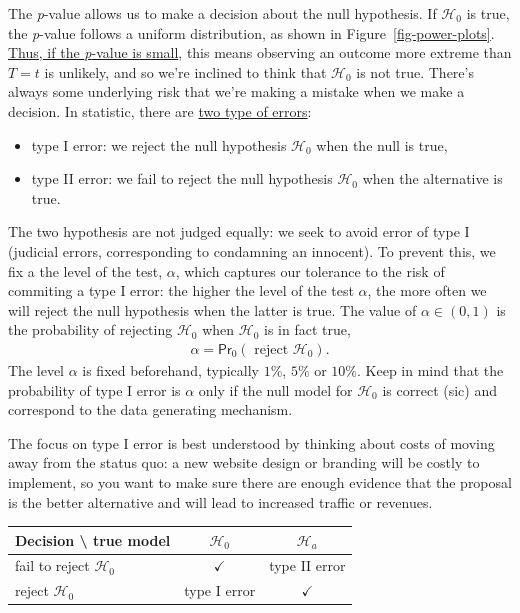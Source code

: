 \documentclass[
  11pt,
  letterpaper,
]{scrbook}
\providecommand{\tightlist}{%
  \setlength{\itemsep}{0pt}\setlength{\parskip}{0pt}}\usepackage{longtable,booktabs,array}
\theoremstyle{definition}
\theoremstyle{remark}
\begin{document}
The \emph{p}-value allows us to make a decision about the null
hypothesis. If \(\mathscr{H}_0\) is true, the \emph{p}-value follows a
uniform distribution, as shown in Figure~\ref{fig-power-plots}.
\href{https://xkcd.com/1478/}{Thus, if the \emph{p}-value is small},
this means observing an outcome more extreme than \(T=t\) is unlikely,
and so we're inclined to think that \(\mathscr{H}_0\) is not true.
There's always some underlying risk that we're making a mistake when we
make a decision. In statistic, there are
\href{https://xkcd.com/2303/}{two type of errors}:

\begin{itemize}
\tightlist
\item
  type I error: we reject the null hypothesis \(\mathscr{H}_0\) when the
  null is true,
\item
  type II error: we fail to reject the null hypothesis \(\mathscr{H}_0\)
  when the alternative is true.
\end{itemize}

The two hypothesis are not judged equally: we seek to avoid error of
type I (judicial errors, corresponding to condamning an innocent). To
prevent this, we fix a the level of the test, \(\alpha\), which captures
our tolerance to the risk of commiting a type I error: the higher the
level of the test \(\alpha\), the more often we will reject the null
hypothesis when the latter is true. The value of \(\alpha \in (0, 1)\)
is the probability of rejecting \(\mathscr{H}_0\) when \(\mathscr{H}_0\)
is in fact true, \begin{align*}
\alpha = \mathsf{Pr}_0\left(\text{ reject } \mathscr{H}_0\right).
\end{align*} The level \(\alpha\) is fixed beforehand, typically
\(1\)\%, \(5\)\% or \(10\)\%. Keep in mind that the probability of type
I error is \(\alpha\) only if the null model for \(\mathscr{H}_0\) is
correct (sic) and correspond to the data generating mechanism.

The focus on type I error is best understood by thinking about costs of
moving away from the status quo: a new website design or branding will
be costly to implement, so you want to make sure there are enough
evidence that the proposal is the better alternative and will lead to
increased traffic or revenues.

\begin{longtable}[]{@{}lcc@{}}
\toprule\noalign{}
\textbf{Decision} \textbackslash{} \textbf{true model} &
\(\mathscr{H}_0\) & \(\mathscr{H}_a\) \\
\midrule\noalign{}
\endhead
\bottomrule\noalign{}
\endlastfoot
fail to reject \(\mathscr{H}_0\) & \(\checkmark\) & type II error \\
reject \(\mathscr{H}_0\) & type I error & \(\checkmark\) \\
\end{longtable}
\end{document}
